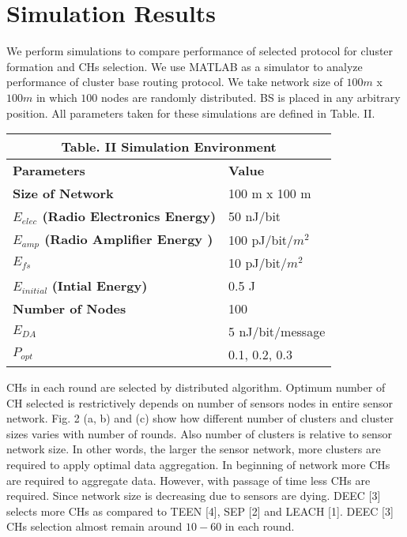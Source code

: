 \documentclass[10pt, conference, compsocconf]{IEEEtran}
\begin{document}
\section{Simulation Results}
We perform simulations to compare performance of selected protocol for cluster formation and CHs selection. We use MATLAB as a simulator to analyze performance of cluster base routing protocol. We take network size of $100m$ x $100m$ in which $100$ nodes are randomly distributed. BS is placed in any arbitrary position. All parameters taken for these simulations are defined in Table. II.

\vspace{0.5cm}
\begin{table}[!ht]
\begin{center}
\begin{tabular}{| p{3cm} || p{3cm} |}
  \multicolumn{2}{c}{Table. II Simulation Environment}\\
  \hline
  \textbf{Parameters} & \textbf{Value}   \\ \hline \hline
   \textbf{Size of Network	}&  100 m x 100 m	 \\ \hline
    \textbf{$E_{elec}$ (Radio Electronics Energy)}	&  50 nJ/bit	 \\ \hline
     \textbf{$E_{amp}$ (Radio Amplifier Energy )}& 100 pJ/bit/$m^{2}$	 \\ \hline
      $E_{fs}$ & 10 pJ/bit/$m^{2}$	 \\ \hline
      $E_{initial}$ \textbf{(Intial Energy)}	&  0.5 J	 \\ \hline
      \textbf{Number of Nodes}& 100	 \\ \hline
      $E_{DA}$	& 5 nJ/bit/message	 \\ \hline
      $P_{opt}$	& 0.1, 0.2, 0.3	 \\ \hline
\end{tabular}
\end{center}
\end{table}

CHs in each round are selected by distributed algorithm. Optimum number of CH selected is restrictively depends on number of sensors nodes in entire sensor network.  Fig. 2 (a, b)  and (c) show how different number of clusters and cluster sizes varies with number of rounds. Also number of clusters is relative to sensor network size. In other words, the larger the sensor network, more clusters are required to apply optimal data aggregation. In beginning of network more CHs are required to aggregate data. However, with passage of time less CHs are required. Since network size is decreasing due to sensors are dying.  DEEC [3] selects more CHs as compared to TEEN [4], SEP [2] and LEACH [1]. DEEC [3] CHs selection almost remain around $10-60$ in each round.
\end{document}
